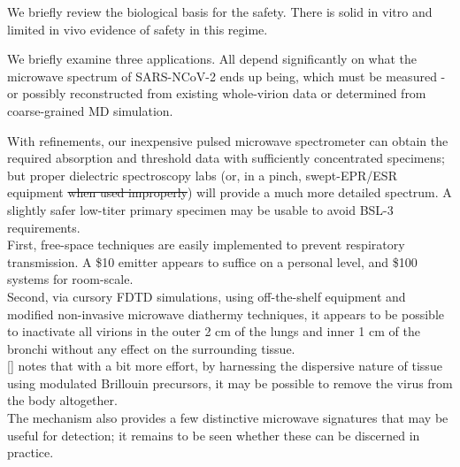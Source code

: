 \documentclass[paper.tex]{subfiles}
\begin{document}
\begin{multicols}{1}
We briefly review the biological basis for the safety. There is solid in vitro and limited in vivo evidence of safety in this regime.


We briefly examine three applications. All depend significantly on what the microwave spectrum of SARS-NCoV-2 ends up being, which must be measured - or possibly reconstructed from existing whole-virion data or determined from coarse-grained MD simulation. 

With refinements, our inexpensive pulsed microwave spectrometer can obtain the required absorption and threshold data with sufficiently concentrated specimens; but proper dielectric spectroscopy labs (or, in a pinch, swept-EPR/ESR equipment \st{when used improperly}) will provide a much more detailed spectrum. A slightly safer low-titer primary specimen may be usable to avoid BSL-3 requirements. \\



First, free-space techniques are easily implemented to prevent respiratory transmission. A \$10 emitter appears to suffice on a personal level, and \$100 systems for room-scale.\\

%
Second, via cursory FDTD simulations, using off-the-shelf equipment and modified non-invasive microwave diathermy techniques, it appears to be possible to inactivate all virions in the outer 2 cm of the lungs and inner 1 cm of the bronchi without any effect on the surrounding tissue. 
\\

[] notes that with a bit more effort, by harnessing the dispersive nature of tissue using modulated Brillouin precursors, it may be possible to remove the virus from the body altogether.\\

The mechanism also provides a few distinctive microwave signatures that may be useful for detection; it remains to be seen whether these can be discerned in practice.


\end{multicols}
\end{document}
